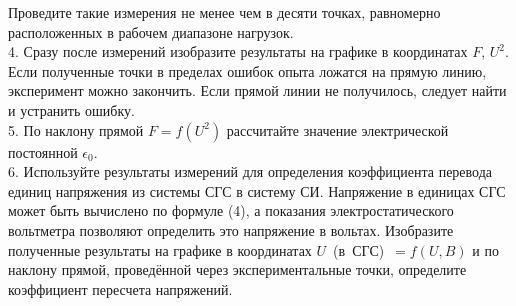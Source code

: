 Проведите такие измерения не менее чем в десяти точках, равномерно расположенных в рабочем диапазоне нагрузок.\\
4. Сразу после измерений изобразите результаты на графике в координатах $F$, $U^2$. Если полученные точки в пределах ошибок опыта ложатся на прямую линию, эксперимент можно закончить. Если прямой линии не получилось, следует найти и устранить ошибку.\\
5. По наклону прямой $F = f(U^2)$ рассчитайте значение электрической постоянной $\epsilon_0$.\\
6. Используйте результаты измерений для определения коэффициента перевода единиц напряжения из системы СГС в систему СИ. Напряжение в единицах СГС может быть вычислено по формуле (4), а показания электростатического вольтметра позволяют определить это напряжение в вольтах. Изобразите полученные результаты на графике в координатах $U$~(в~СГС)~$= f(U, B)$ и по наклону прямой, проведённой через экспериментальные точки, определите коэффициент пересчета напряжений.
\\
\\
\\
\\
\\
\\
\\
\\
\\
\\
\\
\\
\\
\\
\\
\\
\\
\\
\\
\\
\\
\\
\\
\\
\\
\\
\\
\\
\\
\\
\\
\\
\\
\\
\\
\\
\\
